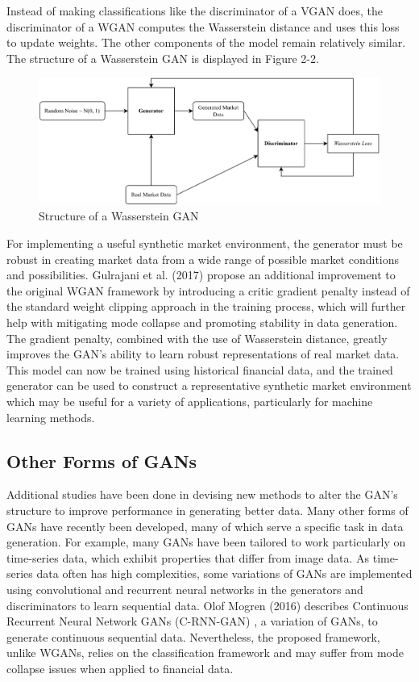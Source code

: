 \noindent Instead of making classifications like the discriminator of a VGAN does, the discriminator of a WGAN computes the Wasserstein distance and uses this loss to update weights. The other components of the model remain relatively similar. The structure of a Wasserstein GAN is displayed in Figure 2-2.
\begin{figure}[H]
\centering
\includegraphics[width=15cm]{templates/assets/gan/wgan_architecture.png}
\caption{Structure of a Wasserstein GAN}
\end{figure}
\noindent For implementing a useful synthetic market environment, the generator must be robust in creating market data from a wide range of possible market conditions and possibilities. Gulrajani et al. (2017) propose an additional improvement to the original WGAN framework by introducing a critic gradient penalty \cite{wgan-gp} instead of the standard weight clipping approach in the training process, which will further help with mitigating mode collapse and promoting stability in data generation. The gradient penalty, combined with the use of Wasserstein distance, greatly improves the GAN's ability to learn robust representations of real market data. This model can now be trained using historical financial data, and the trained generator can be used to construct a representative synthetic market environment which may be useful for a variety of applications, particularly for machine learning methods.

\subsection{Other Forms of GANs}

Additional studies have been done in devising new methods to alter the GAN's structure to improve performance in generating better data. Many other forms of GANs have recently been developed, many of which serve a specific task in data generation. For example, many GANs have been tailored to work particularly on time-series data, which exhibit properties that differ from image data. As time-series data often has high complexities, some variations of GANs are implemented using convolutional and recurrent neural networks in the generators and discriminators to learn sequential data. Olof Mogren (2016) describes Continuous Recurrent Neural Network GANs (C-RNN-GAN) \cite{crnngan}, a variation of GANs, to generate continuous sequential data. Nevertheless, the proposed framework, unlike WGANs, relies on the classification framework and may suffer from mode collapse issues when applied to financial data.

